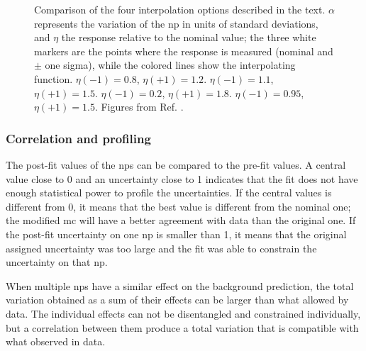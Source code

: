 \begin{figure}[hbt]
\caption{Comparison of the four interpolation options described in the text. $\alpha$ represents the variation of the \gls{np} in units of standard deviations, and $\eta$ the response relative to the nominal value; the three white markers are the points where the response is measured (nominal and $\pm$ one sigma), while the colored lines show the interpolating function.
 $\eta(-1) = 0.8$, $\eta(+1) = 1.2$.
 $\eta(-1) = 1.1$, $\eta(+1) = 1.5$.
 $\eta(-1) = 0.2$, $\eta(+1) = 1.8$.
 $\eta(-1) = 0.95$, $\eta(+1) = 1.5$.
Figures from Ref. \cite{Cranmer:1456844}.
}
\label{fig:stat:interp}
\end{figure}


\subsubsection*{Correlation and profiling}

The post-fit values of the \glspl{np} can be compared to the pre-fit values. A central value close to 0 and an uncertainty close to 1 indicates that the fit does not have enough statistical power to profile the uncertainties. If the central values is different from 0, it means that the best value is different from the nominal one; the modified \gls{mc} will have a better agreement with data than the original one. If the post-fit uncertainty on one \gls{np} is smaller than 1, it means that the original assigned uncertainty was too large and the fit was able to constrain the uncertainty on that \gls{np}.

When multiple \glspl{np} have a similar effect on the background prediction, the total variation obtained as a sum of their effects can be larger than what allowed by data. The individual effects can not be disentangled and constrained individually, but a correlation between them produce a total variation that is compatible with what observed in data. %


